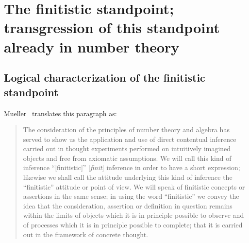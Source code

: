 \paragraph{} %

\paragraph{} %

\paragraph{} %

\paragraph{} %

\paragraph{} %

\paragraph{} %

\paragraph{} %

\section{The finitistic standpoint; transgression of this standpoint already in number theory}

\subsection{Logical characterization of the finitistic standpoint}
\paragraph{} %

Mueller~\cite[p.44]{mueller2006grundlagen} translates this paragraph
as:
\begin{quote}
The consideration of the principles of number theory and algebra has
served to show us the application and use of direct contentual
inference carried out in thought experiments performed on intuitively
imagined objects and free from axiomatic assumptions. We will call
this kind of inference ``[finitistic]'' [\textit{finit\/}] inference
in order to have a short expression; likewise we shall call the
attitude underlying this kind of inference the ``finitistic'' attitude
or point of view. We will speak of finitistic concepts or assertions
in the same sense; in using the word ``finitistic'' we convey the idea
that the consideration, assertion or definition in question remains
within the limits of objects which it is in principle possible to
observe and of processes which it is in principle possible to
complete; that it is carried out in the framework of concrete thought.
\end{quote}

